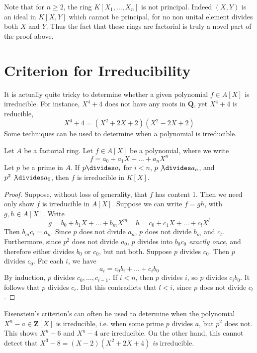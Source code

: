 Note that for $n \geq 2$, the ring $K[X_1, \dots, X_n]$ is not principal. Indeed $(X,Y)$ is an ideal in $K[X,Y]$ which cannot be principal, for no non unital element divides both $X$ and $Y$. Thus the fact that these rings are factorial is truly a novel part of the proof above.





\section{Criterion for Irreducibility}

It is actually quite tricky to determine whether a given polynomial $f \in A[X]$ is irreducible. For instance, $X^4 + 4$ does not have any roots in $\mathbf{Q}$, yet $X^4 + 4$ is reducible,
%
\[ X^4 + 4 = (X^2 + 2X + 2)(X^2 - 2X + 2) \]
%
Some techniques can be used to determine when a polynomial is irreducible.

\begin{theorem}[Eisenstein]
    Let $A$ be a factorial ring. Let $f \in A[X]$ be a polynomial, where we write
    \[ f = a_0 + a_1 X + \dots + a_n X^n \]
    Let $p$ be a prime in $A$. If $p \divides a_i$ for $i < n$, $p \not \divides a_n$, and $p^2 \not \divides a_0$, then $f$ is irreducible in $K[X]$.
\end{theorem}
\begin{proof}
    Suppose, without loss of generality, that $f$ has content 1. Then we need only show $f$ is irreducible in $A[X]$. Suppose we can write $f = gh$, with $g, h \in A[X]$. Write
    \[ g = b_0 + b_1 X + \dots + b_m X^m\ \ \ \ \ h = c_0 + c_1 X + \dots + c_l X^l \]
    Then $b_m c_l = a_n$. Since $p$ does not divide $a_n$, $p$ does not divide $b_m$ and $c_l$. Furthermore, since $p^2$ does not divide $a_0$, $p$ divides into $b_0c_0$ {\it exactly once}, and therefore either divides $b_0$ or $c_0$, but not both. Suppose $p$ divides $c_0$. Then $p$ divides $c_0$. For each $i$, we have
    \[ a_i = c_0 b_i + \dots + c_i b_0 \]
    By induction, $p$ divides $c_0, \dots, c_{i-1}$. If $i < n$, then $p$ divides $i$, so $p$ divides $c_i b_0$. It follows that $p$ divides $c_i$. But this contradicts that $l < i$, since $p$ does not divide $c_l$.
\end{proof}

\begin{example}
	Eisenstein's criterion's can often be used to determine when the polynomial $X^n - a \in \mathbf{Z}[X]$ is irreducible, i.e. when some prime $p$ divides $a$, but $p^2$ does not. This shows $X^n - 6$ and $X^n - 4$ are irreducible. On the other hand, this cannot detect that $X^3 - 8 = (X - 2)(X^2 + 2X + 4)$ {\it is} irreducible.
\end{example}

